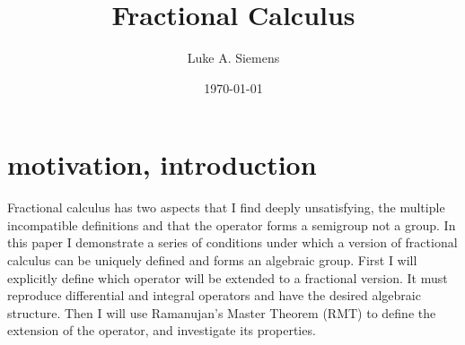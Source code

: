 \documentclass[%
 onecolumn,
 amsmath, amssymb, aps, pra, 10pt
]{revtex4-2}
\begin{document}
\title{Fractional Calculus}%
\author{Luke A. Siemens}
\noaffiliation
\date{\today}
\maketitle

\section{motivation, introduction}
Fractional calculus has two aspects that I find deeply unsatisfying, the multiple incompatible definitions and that the operator forms a semigroup not a group. In this paper I demonstrate a series of conditions under which a version of fractional calculus can be uniquely defined and forms an algebraic group. First I will explicitly define which operator will be extended to a fractional version. It must reproduce differential and integral operators and have the desired algebraic structure. Then I will use Ramanujan's Master Theorem (RMT) to define the extension of the operator, and investigate its properties.  
\end{document}
